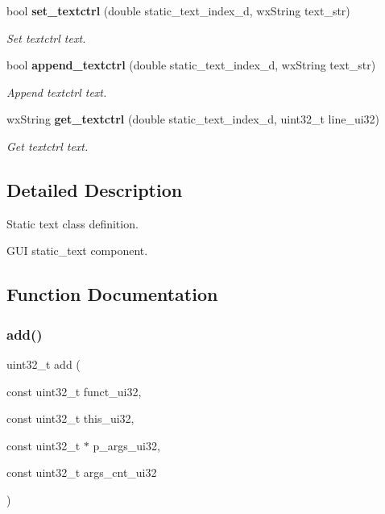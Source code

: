\begin{DoxyCompactItemize}
bool \textbf{ set\+\_\+textctrl} (double static\+\_\+text\+\_\+index\+\_\+d, wx\+String text\+\_\+str)
\begin{DoxyCompactList}\small\item\em Set textctrl text. \end{DoxyCompactList}\item 
bool \textbf{ append\+\_\+textctrl} (double static\+\_\+text\+\_\+index\+\_\+d, wx\+String text\+\_\+str)
\begin{DoxyCompactList}\small\item\em Append textctrl text. \end{DoxyCompactList}\item 
wx\+String \textbf{ get\+\_\+textctrl} (double static\+\_\+text\+\_\+index\+\_\+d, uint32\+\_\+t line\+\_\+ui32)
\begin{DoxyCompactList}\small\item\em Get textctrl text. \end{DoxyCompactList}\end{DoxyCompactItemize}


\subsection{Detailed Description}
Static text class definition. 

G\+UI static\+\_\+text component.

\subsection{Function Documentation}
\mbox{\label{group___static__text_ga490542606fe12f142cd2b00cb1ecaefd}} 
\subsubsection{add()}
{\footnotesize\ttfamily uint32\+\_\+t add (\begin{DoxyParamCaption}\item[{const uint32\+\_\+t}]{funct\+\_\+ui32,  }\item[{const uint32\+\_\+t}]{this\+\_\+ui32,  }\item[{const uint32\+\_\+t $\ast$}]{p\+\_\+args\+\_\+ui32,  }\item[{const uint32\+\_\+t}]{args\+\_\+cnt\+\_\+ui32 }\end{DoxyParamCaption})\hspace{0.3cm}{\ttfamily [static]}}




